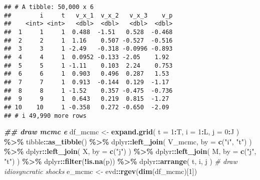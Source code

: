 \documentclass[
]{book}
\newenvironment{Shaded}{\begin{snugshade}}{\end{snugshade}}
\newcommand{\AttributeTok}[1]{\textcolor[rgb]{0.13,0.29,0.53}{#1}}
\newcommand{\CommentTok}[1]{\textcolor[rgb]{0.56,0.35,0.01}{\textit{#1}}}
\newcommand{\DecValTok}[1]{\textcolor[rgb]{0.00,0.00,0.81}{#1}}
\newcommand{\DocumentationTok}[1]{\textcolor[rgb]{0.56,0.35,0.01}{\textbf{\textit{#1}}}}
\newcommand{\FunctionTok}[1]{\textcolor[rgb]{0.13,0.29,0.53}{\textbf{#1}}}
\newcommand{\NormalTok}[1]{#1}
\newcommand{\OtherTok}[1]{\textcolor[rgb]{0.56,0.35,0.01}{#1}}
\newcommand{\SpecialCharTok}[1]{\textcolor[rgb]{0.81,0.36,0.00}{\textbf{#1}}}
\newcommand{\StringTok}[1]{\textcolor[rgb]{0.31,0.60,0.02}{#1}}
\begin{document}
\begin{verbatim}
## # A tibble: 50,000 x 6
##        i     t   v_x_1  v_x_2   v_x_3    v_p
##    <int> <int>   <dbl>  <dbl>   <dbl>  <dbl>
##  1     1     1  0.488  -1.51   0.528  -0.468
##  2     2     1  1.16    0.507 -0.527  -0.516
##  3     3     1 -2.49   -0.318 -0.0996 -0.893
##  4     4     1  0.0952 -0.133 -2.05    1.92 
##  5     5     1 -1.11    0.103  2.24    0.753
##  6     6     1  0.903   0.496  0.287   1.53 
##  7     7     1  0.913  -0.144  0.129  -1.17 
##  8     8     1 -1.52    0.357 -0.475  -0.736
##  9     9     1  0.643   0.219  0.815  -1.27 
## 10    10     1 -0.358   0.272 -0.650  -2.09 
## # i 49,990 more rows
\end{verbatim}

\begin{Shaded}
\begin{Highlighting}[]
\DocumentationTok{\#\# draw mcmc e}
\NormalTok{df\_mcmc }\OtherTok{\textless{}{-}} 
  \FunctionTok{expand.grid}\NormalTok{(}
    \AttributeTok{t =} \DecValTok{1}\SpecialCharTok{:}\NormalTok{T, }
    \AttributeTok{i =} \DecValTok{1}\SpecialCharTok{:}\NormalTok{L, }
    \AttributeTok{j =} \DecValTok{0}\SpecialCharTok{:}\NormalTok{J}
\NormalTok{    ) }\SpecialCharTok{\%\textgreater{}\%}
\NormalTok{    tibble}\SpecialCharTok{::}\FunctionTok{as\_tibble}\NormalTok{() }\SpecialCharTok{\%\textgreater{}\%}
\NormalTok{    dplyr}\SpecialCharTok{::}\FunctionTok{left\_join}\NormalTok{(}
\NormalTok{      V\_mcmc, }
      \AttributeTok{by =} \FunctionTok{c}\NormalTok{(}\StringTok{"i"}\NormalTok{, }\StringTok{"t"}\NormalTok{)}
\NormalTok{      ) }\SpecialCharTok{\%\textgreater{}\%}
\NormalTok{    dplyr}\SpecialCharTok{::}\FunctionTok{left\_join}\NormalTok{(}
\NormalTok{      X, }
      \AttributeTok{by =} \FunctionTok{c}\NormalTok{(}\StringTok{"j"}\NormalTok{)}
\NormalTok{      ) }\SpecialCharTok{\%\textgreater{}\%}
\NormalTok{    dplyr}\SpecialCharTok{::}\FunctionTok{left\_join}\NormalTok{(}
\NormalTok{      M, }
      \AttributeTok{by =} \FunctionTok{c}\NormalTok{(}\StringTok{"j"}\NormalTok{, }\StringTok{"t"}\NormalTok{)}
\NormalTok{      ) }\SpecialCharTok{\%\textgreater{}\%}
\NormalTok{    dplyr}\SpecialCharTok{::}\FunctionTok{filter}\NormalTok{(}\SpecialCharTok{!}\FunctionTok{is.na}\NormalTok{(p)) }\SpecialCharTok{\%\textgreater{}\%}
\NormalTok{    dplyr}\SpecialCharTok{::}\FunctionTok{arrange}\NormalTok{(}
\NormalTok{      t, }
\NormalTok{      i, }
\NormalTok{      j}
\NormalTok{      )}
\CommentTok{\# draw idiosyncratic shocks}
\NormalTok{e\_mcmc }\OtherTok{\textless{}{-}}\NormalTok{ evd}\SpecialCharTok{::}\FunctionTok{rgev}\NormalTok{(}\FunctionTok{dim}\NormalTok{(df\_mcmc)[}\DecValTok{1}\NormalTok{])}
\end{Highlighting}
\end{Shaded}
\end{document}
